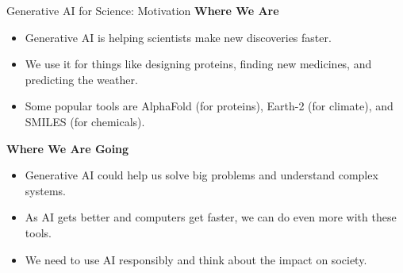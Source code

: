 \begin{frame}[allowframebreaks]{}
    \begin{figure}
        \centering
    \end{figure}
\end{frame}

\begin{frame}[allowframebreaks]{Generative AI for Science: Motivation}
\textbf{Where We Are}
\begin{itemize}
    \item Generative AI is helping scientists make new discoveries faster.
    \item We use it for things like designing proteins, finding new medicines, and predicting the weather.
    \item Some popular tools are AlphaFold (for proteins), Earth-2 (for climate), and SMILES (for chemicals).
\end{itemize}
\textbf{Where We Are Going}
\begin{itemize}
    \item Generative AI could help us solve big problems and understand complex systems.
    \item As AI gets better and computers get faster, we can do even more with these tools.
    \item We need to use AI responsibly and think about the impact on society.
\end{itemize}
\end{frame}